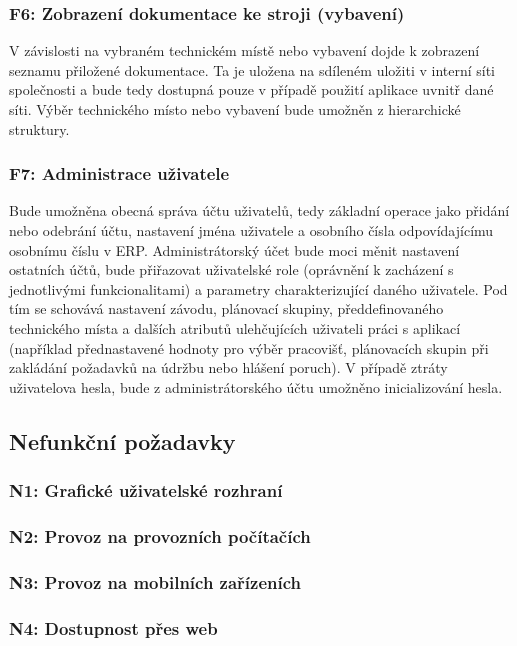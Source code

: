 \documentclass[thesis=M,czech]{FITthesis}[2012/06/26]
\begin{document}
\subsubsection{F6: Zobrazení dokumentace ke stroji (vybavení)}
V závislosti na vybraném technickém místě nebo vybavení dojde k zobrazení seznamu přiložené dokumentace. Ta je uložena na sdíleném uložiti v interní síti společnosti a bude tedy dostupná pouze v případě použití aplikace uvnitř dané síti. Výběr technického místo nebo vybavení bude umožněn z hierarchické struktury.
\subsubsection{F7: Administrace uživatele}
Bude umožněna obecná správa účtu uživatelů, tedy základní operace jako přidání nebo odebrání účtu, nastavení jména uživatele a osobního čísla odpovídajícímu osobnímu číslu v ERP. Administrátorský účet bude moci měnit nastavení ostatních účtů, bude přiřazovat uživatelské role (oprávnění k zacházení s jednotlivými funkcionalitami) a parametry charakterizující daného uživatele. Pod tím se schovává nastavení závodu, plánovací skupiny, předdefinovaného technického místa a dalších atributů ulehčujících uživateli práci s aplikací (například přednastavené hodnoty pro výběr pracovišť, plánovacích skupin při zakládání požadavků na údržbu nebo hlášení poruch). V případě ztráty uživatelova hesla, bude z administrátorského účtu umožněno inicializování hesla.


\subsection{Nefunkční požadavky}

\subsubsection{N1: Grafické uživatelské rozhraní}
\subsubsection{N2: Provoz na provozních počítačích}
\subsubsection{N3: Provoz na mobilních zařízeních}
\subsubsection{N4: Dostupnost přes web}
\end{document}
